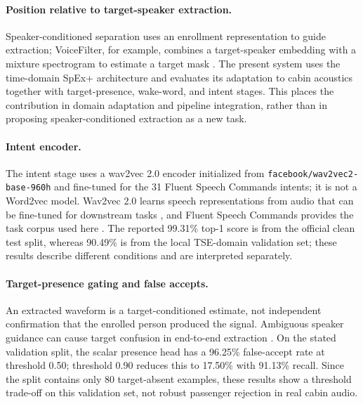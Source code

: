 
\paragraph{Position relative to target-speaker extraction.}
Speaker-conditioned separation uses an enrollment representation to guide extraction; VoiceFilter, for example, combines a target-speaker embedding with a mixture spectrogram to estimate a target mask \cite{voicefilter}. The present system uses the time-domain SpEx+ architecture \cite{spexplus} and evaluates its adaptation to cabin acoustics together with target-presence, wake-word, and intent stages. This places the contribution in domain adaptation and pipeline integration, rather than in proposing speaker-conditioned extraction as a new task.

\paragraph{Intent encoder.}
The intent stage uses a wav2vec 2.0 encoder initialized from \texttt{facebook/wav2vec2-base-960h} and fine-tuned for the 31 Fluent Speech Commands intents; it is not a Word2vec model. Wav2vec 2.0 learns speech representations from audio that can be fine-tuned for downstream tasks \cite{wav2vec2}, and Fluent Speech Commands provides the task corpus used here \cite{fluentcommands}. The reported 99.31\% top-1 score is from the official clean test split, whereas 90.49\% is from the local TSE-domain validation set; these results describe different conditions and are interpreted separately.

\paragraph{Target-presence gating and false accepts.}
An extracted waveform is a target-conditioned estimate, not independent confirmation that the enrolled person produced the signal. Ambiguous speaker guidance can cause target confusion in end-to-end extraction \cite{targetconfusion}. On the stated validation split, the scalar presence head has a 96.25\% false-accept rate at threshold 0.50; threshold 0.90 reduces this to 17.50\% with 91.13\% recall. Since the split contains only 80 target-absent examples, these results show a threshold trade-off on this validation set, not robust passenger rejection in real cabin audio.

